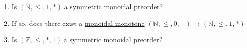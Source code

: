 \begin{enumerate}
    \item  Is $(\mathbb{N},\leq,1,*)$ a \href{doc/1 math/Seven Sketches in Compositionality/Chapter 2: Resource theories/2 Symmetric monoidal preorders/1 Definition and first examples/1 Symmetric monoidal structure on a preorder}{symmetric monoidal preorder}?
    \item If so, does there exist a \href{doc/1 math/Seven Sketches in Compositionality/Chapter 2: Resource theories/2 Symmetric monoidal preorders/5 Monoidal monotone maps/1 Monoidal monotone}{monoidal monotone} $(\mathbb{N},\leq,0,+) \rightarrow (\mathbb{N},\leq,1,*)$
    \item Is $(\mathbb{Z},\leq,*,1)$ a \href{doc/1 math/Seven Sketches in Compositionality/Chapter 2: Resource theories/2 Symmetric monoidal preorders/1 Definition and first examples/1 Symmetric monoidal structure on a preorder}{symmetric monoidal preorder}?
  \end{enumerate}
